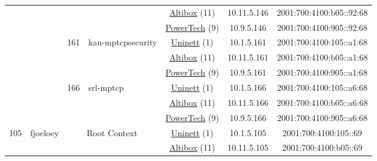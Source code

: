 \begin{small}
\begin{center}
\begin{longtable}{|c|c|c|c|c|c|c|c|}
  &  &  &  & \multicolumn{2}{|c|}{\tiny{\href{https://www.altibox.no}{Altibox} (11)}} & \tiny{10.11.5.146} & \tiny{2001:700:4100:b05::92:68} \\* \cline{5-5}\cline{6-6}\cline{7-7}\cline{8-8}
  &  &  &  & \multicolumn{2}{|c|}{\tiny{\href{http://www.powertech.no}{PowerTech} (9)}} & \tiny{10.9.5.146} & \tiny{2001:700:4100:905::92:68} \\* \cline{3-3}\cline{4-4}\cline{5-5}\cline{6-6}\cline{7-7}\cline{8-8}
  &  & \multirow{3}{*}{\tiny{161}} & \multicolumn{1}{|l|}{\multirow{3}{*}{\tiny{kau-mptcpsecurity}}} & \multicolumn{2}{|c|}{\tiny{\href{https://www.uninett.no}{Uninett} (1)}} & \tiny{10.1.5.161} & \tiny{2001:700:4100:105::a1:68} \\* \cline{5-5}\cline{6-6}\cline{7-7}\cline{8-8}
  &  &  &  & \multicolumn{2}{|c|}{\tiny{\href{https://www.altibox.no}{Altibox} (11)}} & \tiny{10.11.5.161} & \tiny{2001:700:4100:b05::a1:68} \\* \cline{5-5}\cline{6-6}\cline{7-7}\cline{8-8}
  &  &  &  & \multicolumn{2}{|c|}{\tiny{\href{http://www.powertech.no}{PowerTech} (9)}} & \tiny{10.9.5.161} & \tiny{2001:700:4100:905::a1:68} \\* \cline{3-3}\cline{4-4}\cline{5-5}\cline{6-6}\cline{7-7}\cline{8-8}
  &  & \multirow{3}{*}{\tiny{166}} & \multicolumn{1}{|l|}{\multirow{3}{*}{\tiny{srl-mptcp}}} & \multicolumn{2}{|c|}{\tiny{\href{https://www.uninett.no}{Uninett} (1)}} & \tiny{10.1.5.166} & \tiny{2001:700:4100:105::a6:68} \\* \cline{5-5}\cline{6-6}\cline{7-7}\cline{8-8}
  &  &  &  & \multicolumn{2}{|c|}{\tiny{\href{https://www.altibox.no}{Altibox} (11)}} & \tiny{10.11.5.166} & \tiny{2001:700:4100:b05::a6:68} \\* \cline{5-5}\cline{6-6}\cline{7-7}\cline{8-8}
  &  &  &  & \multicolumn{2}{|c|}{\tiny{\href{http://www.powertech.no}{PowerTech} (9)}} & \tiny{10.9.5.166} & \tiny{2001:700:4100:905::a6:68} \\ \hline
 \multirow{21}{*}{\tiny{105}} & \multicolumn{1}{|l|}{\multirow{21}{*}{\tiny{fjoeloey}}} & \multicolumn{2}{|c|}{\multirow{3}{*}{\tiny{Root Context}}} & \multicolumn{2}{|c|}{\tiny{\href{https://www.uninett.no}{Uninett} (1)}} & \tiny{10.1.5.105} & \tiny{2001:700:4100:105::69} \\* \cline{5-5}\cline{6-6}\cline{7-7}\cline{8-8}
  &  & \multicolumn{2}{|c|}{} & \multicolumn{2}{|c|}{\tiny{\href{https://www.altibox.no}{Altibox} (11)}} & \tiny{10.11.5.105} & \tiny{2001:700:4100:b05::69} \\* \cline{5-5}\cline{6-6}\cline{7-7}\cline{8-8}

\end{longtable}
\end{center}
\end{small}
